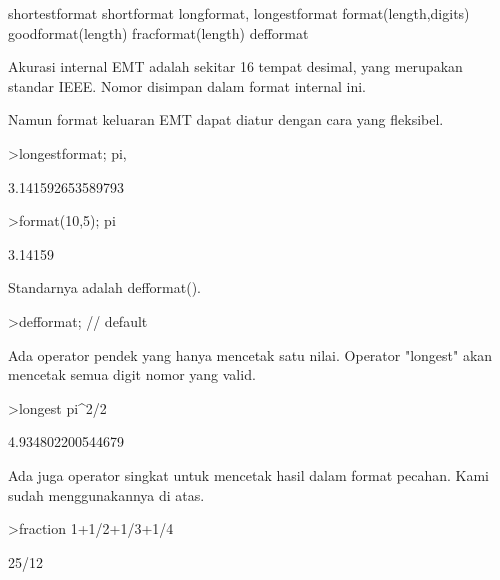 \documentclass[a4paper,10pt]{article}
\begin{document}
\begin{eulernotebook}
\begin{eulercomment}
\begin{eulercomment}
\begin{eulercomment}
\begin{eulercomment}
\begin{eulercomment}
\end{eulercomment}
\begin{eulerttcomment}
 shortestformat shortformat longformat, longestformat
 format(length,digits) goodformat(length)
 fracformat(length)
 defformat
\end{eulerttcomment}
\begin{eulercomment}

Akurasi internal EMT adalah sekitar 16 tempat desimal, yang merupakan
standar IEEE. Nomor disimpan dalam format internal ini.

Namun format keluaran EMT dapat diatur dengan cara yang fleksibel.
\end{eulercomment}
\begin{eulerprompt}
>longestformat; pi,
\end{eulerprompt}
\begin{euleroutput}
  3.141592653589793
\end{euleroutput}
\begin{eulerprompt}
>format(10,5); pi
\end{eulerprompt}
\begin{euleroutput}
    3.14159 
\end{euleroutput}
\begin{eulercomment}
Standarnya adalah defformat().
\end{eulercomment}
\begin{eulerprompt}
>defformat; // default
\end{eulerprompt}
\begin{eulercomment}
Ada operator pendek yang hanya mencetak satu nilai. Operator "longest"
akan mencetak semua digit nomor yang valid.
\end{eulercomment}
\begin{eulerprompt}
>longest pi^2/2
\end{eulerprompt}
\begin{euleroutput}
        4.934802200544679 
\end{euleroutput}
\begin{eulercomment}
Ada juga operator singkat untuk mencetak hasil dalam format pecahan.
Kami sudah menggunakannya di atas.
\end{eulercomment}
\begin{eulerprompt}
>fraction 1+1/2+1/3+1/4
\end{eulerprompt}
\begin{euleroutput}
  25/12
\end{euleroutput}
\begin{eulercomment}

\end{eulercomment}
\end{eulercomment}
\end{eulercomment}
\end{eulercomment}
\end{eulercomment}
\end{eulernotebook}
\end{document}
